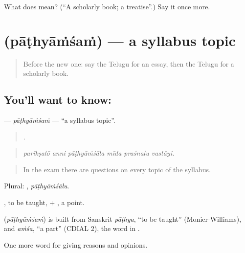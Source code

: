 \begin{tcolorbox}[breakable,colback=teal!4,colframe=teal!35!black,title={Before you move on}]
What does  mean? (\textquotedblleft{}A scholarly book; a treatise\textquotedblright{}.) Say it once more.
\end{tcolorbox}
\section[\texorpdfstring{\te{పాఠ్యాంశం} (pāṭhyāṁśaṁ)}{పాఠ్యాంశం (pāṭhyāṁśaṁ)}]{ (pāṭhyāṁśaṁ) — a syllabus topic}

\label{lesson:TE-C416-pathyamsam}



\begin{quote}
Before the new one: say the Telugu for an essay, then the Telugu for a scholarly book.
\end{quote}

\subsection*{You'll want to know: }
\textbf{} — \emph{pāṭhyāṁśaṁ} — \textquotedblleft{}a syllabus topic\textquotedblright{}.

\begin{quote}
     .
\end{quote}

\begin{quote}
\emph{parīkṣalō anni pāṭhyāṁśāla mīda praśnalu vastāyi.}
\end{quote}

\begin{quote}
In the exam there are questions on every topic of the syllabus.
\end{quote}

Plural: , \emph{pāṭhyāṁśālu}.

, to be taught, + , a point.

\begin{cousinweb}
\textbf{} (\emph{pāṭhyāṁśaṁ}) is built from Sanskrit \emph{pāṭhya}, \textquotedblleft{}to be taught\textquotedblright{} (Monier-Williams), and \emph{aṁśa}, \textquotedblleft{}a part\textquotedblright{} (CDIAL 2), the word in .
\end{cousinweb}

\begin{grammarlens}[title={What you've built}]
One more word for giving reasons and opinions.
\end{grammarlens}

